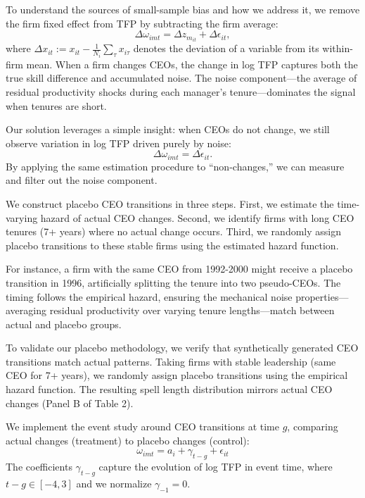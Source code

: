 \documentclass[11pt,a4paper]{article}
\begin{document}
To understand the sources of small-sample bias and how we address it, we remove the firm fixed effect from TFP by subtracting the firm average:
\begin{equation}
\Delta\omega_{imt} = \Delta z_{m_{it}} + \Delta\epsilon_{it},
\end{equation}
where $\Delta x_{it} := x_{it} - \frac{1}{N_i}\sum_{\tau} x_{i\tau}$ denotes the deviation of a variable from its within-firm mean. When a firm changes CEOs, the change in log TFP captures both the true skill difference and accumulated noise. The noise component---the average of residual productivity shocks during each manager's tenure---dominates the signal when tenures are short. 

Our solution leverages a simple insight: when CEOs do not change, we still observe variation in log TFP driven purely by noise:
\begin{equation}
\Delta\omega_{imt} = \Delta\epsilon_{it}.
\end{equation}
By applying the same estimation procedure to ``non-changes,'' we can measure and filter out the noise component.

We construct placebo CEO transitions in three steps. First, we estimate the time-varying hazard of actual CEO changes. Second, we identify firms with long CEO tenures (7+ years) where no actual change occurs. Third, we randomly assign placebo transitions to these stable firms using the estimated hazard function.

For instance, a firm with the same CEO from 1992-2000 might receive a placebo transition in 1996, artificially splitting the tenure into two pseudo-CEOs. The timing follows the empirical hazard, ensuring the mechanical noise properties—averaging residual productivity over varying tenure lengths—match between actual and placebo groups.

To validate our placebo methodology, we verify that synthetically generated CEO transitions match actual patterns. Taking firms with stable leadership (same CEO for 7+ years), we randomly assign placebo transitions using the empirical hazard function. The resulting spell length distribution mirrors actual CEO changes (Panel B of Table 2).

We implement the event study around CEO transitions at time $g$, comparing actual changes (treatment) to placebo changes (control):
\begin{equation}
\omega_{imt} = a_i + \gamma_{t-g} + \epsilon_{it}
\end{equation}
The coefficients $\gamma_{t-g}$ capture the evolution of log TFP in event time, where $t-g \in [-4, 3]$ and we normalize $\gamma_{-1} = 0$.
\end{document}
